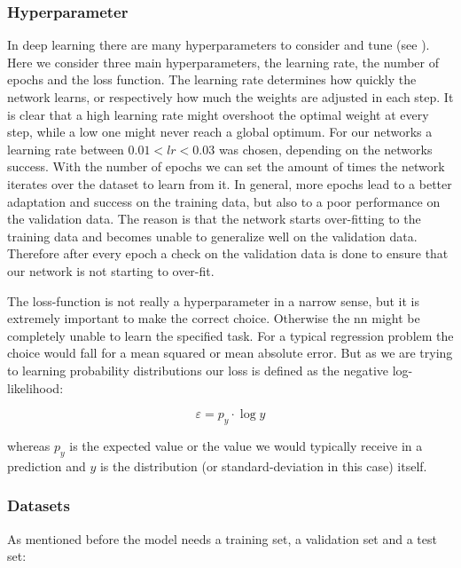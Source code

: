 		\subsubsection{Hyperparameter}
		In deep learning there are many hyperparameters to consider and tune (see \cite[p. 415f]{deep-learning}). Here we consider three main hyperparameters, the learning rate, the number of epochs and the loss function. \newline
		The learning rate determines how quickly the network learns, or respectively how much the weights are adjusted in each step. It is clear that a high learning rate might overshoot the optimal weight at every step, while a low one might never reach a global optimum. For our networks a learning rate between $0.01 < lr < 0.03$ was chosen, depending on the networks success. \newline
		With the number of epochs we can set the amount of times the network iterates over the dataset to learn from it. In general, more epochs lead to a better adaptation and success on the training data, but also to a poor performance on the validation data. The reason is that the network starts over-fitting to the training data and becomes unable to generalize well on the validation data. Therefore after every epoch a check on the validation data is done to ensure that our network is not starting to over-fit.
				
		The loss-function is not really a hyperparameter in a narrow sense, but it is extremely important to make the correct choice. Otherwise the \ac{nn} might be completely unable to learn the specified task. For a typical regression problem the choice would fall for a mean squared or mean absolute error. But as we are trying to learning probability distributions our loss is defined as the negative log-likelihood:
		
		\begin{equation}
		\varepsilon = p_y\cdot \log y
		\end{equation}
		
		whereas $p_y$ is the expected value or the value we would typically receive in a prediction and $y$ is the distribution (or standard-deviation in this case) itself.
				
		\subsubsection{Datasets}
		As mentioned before the model needs a training set, a validation set and a test set:
		
